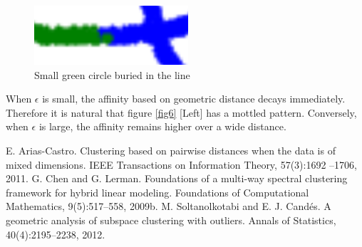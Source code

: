 \documentclass[11pt,reqno]{amsart}
\numberwithin{equation}{section}
\theoremstyle{plain}
\begin{document}
\begin{figure}[htbp]
\centering
\includegraphics[width=0.3  \textwidth]{boundary.png}
\vspace{-1em}
\caption{Small green circle buried in the line}
\label{fig7}
\end{figure}

When $\epsilon$ is small, the affinity based on geometric distance decays immediately. Therefore it is natural that figure \ref{fig6} [Left] has a mottled  pattern. Conversely, when $\epsilon$ is large, the affinity remains higher over a wide distance.

\begin{thebibliography}{}
E. Arias-Castro. Clustering based on pairwise distances when the data is of mixed dimensions.
IEEE Transactions on Information Theory, 57(3):1692 –1706, 2011.
G. Chen and G. Lerman. Foundations of a multi-way spectral clustering framework for
hybrid linear modeling. Foundations of Computational Mathematics, 9(5):517–558, 2009b.
M. Soltanolkotabi and E. J. Cand\'es. A geometric analysis of subspace clustering with
outliers. Annals of Statistics, 40(4):2195–2238, 2012.
\end{thebibliography}
\end{document}
